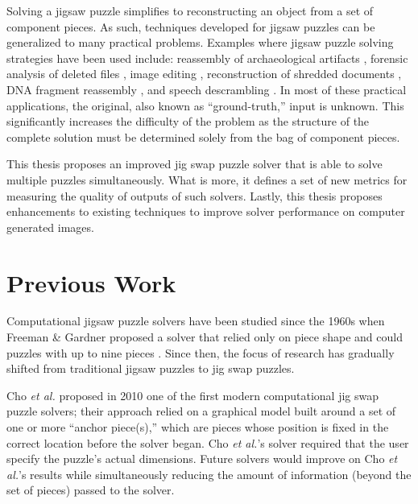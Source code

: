\documentclass{report}
\begin{document}
Solving a jigsaw puzzle simplifies to reconstructing an object from a set of component pieces.  As such, techniques developed for jigsaw puzzles can be generalized to many practical problems.  Examples where jigsaw puzzle solving strategies have been used include: reassembly of archaeological artifacts \cite{brown2008, koller2006}, forensic analysis of deleted files \cite{garfinkel2010}, image editing \cite{cho2008}, reconstruction of shredded documents \cite{zhu2008}, DNA fragment reassembly \cite{marande2007}, and speech descrambling \cite{zhao2007}.  In most of these practical applications, the original, also known as ``ground-truth,'' input is unknown.  This significantly increases the difficulty of the problem as the structure of the complete solution must be determined solely from the bag of component pieces.

This thesis proposes an improved jig swap puzzle solver that is able to solve multiple puzzles simultaneously.  What is more, it defines a set of new metrics for measuring the quality of outputs of such solvers.  Lastly, this thesis proposes enhancements to existing techniques to improve solver performance on computer generated images.




\pagebreak
\section{Previous Work}\label{sec:previousWork}

Computational jigsaw puzzle solvers have been studied since the 1960s when Freeman \& Gardner proposed a solver that relied only on piece shape and could puzzles with up to nine pieces \cite{freeman1964}.  Since then, the focus of research has gradually shifted from traditional jigsaw puzzles to jig swap puzzles.  

Cho \textit{et al.} \citep{cho2010} proposed in 2010 one of the first modern computational jig swap puzzle solvers; their approach relied on a graphical model built around a set of one or more ``anchor piece(s),'' which are pieces whose position is fixed in the correct location before the solver began.  Cho \textit{et al.}'s solver required that the user specify the puzzle's actual dimensions.  Future solvers would improve on Cho \textit{et al.}'s results while simultaneously reducing the amount of information (beyond the set of pieces) passed to the solver.
\end{document}
